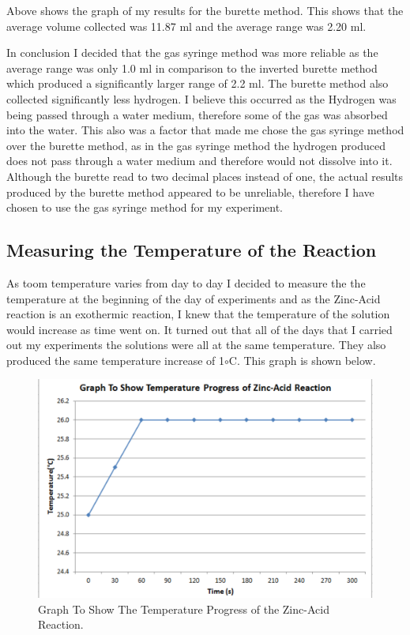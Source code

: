 Above shows the graph of my results for the burette method. This shows that the average volume collected was 11.87 ml and the average range was 2.20 ml. 


In conclusion I decided that the gas syringe method was more reliable as the average range was only 1.0 ml in comparison to the inverted burette method which produced a significantly larger range of 2.2 ml.  The burette method also collected significantly less hydrogen. I believe this occurred as the Hydrogen was being passed through a water medium, therefore some of the gas was absorbed into the water. This also was a factor that made me chose the gas syringe method over the burette method, as in the gas syringe method the hydrogen produced does not pass through a water medium and therefore would not dissolve into it. Although the burette read to two decimal places instead of one, the actual results produced by the burette method appeared to be unreliable, therefore I have chosen to use the gas syringe method for my experiment.




	\subsection{Measuring the Temperature of the Reaction}

As toom temperature varies from day to day I decided to measure the the temperature at the beginning of the day of experiments and as the Zinc-Acid reaction is an exothermic reaction, I knew that the temperature of the solution would increase as time went on. It turned out that all of the days that I carried out my experiments the solutions were all at the same temperature. They also produced the same temperature increase of 1$\circ$C. This graph is shown below.


\begin{figure}[H]
    \includegraphics[width=\textwidth]{./preliminarywork/graphs/Temperature.pdf}
    \caption{Graph To Show The Temperature Progress of the Zinc-Acid Reaction.} \label{fig:Temperature Graph}
\end{figure}

